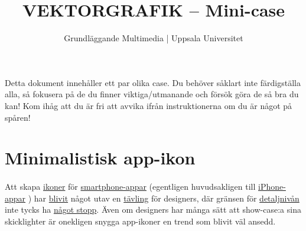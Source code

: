 \documentclass{article}
\begin{document}
  \title{ VEKTORGRAFIK -- Mini-case }
  \author{ Grundläggande Multimedia | Uppsala Universitet }
  \date{}
  \maketitle

  \paragraph{}
  Detta dokument innehåller ett par olika case. Du behöver såklart inte färdigställa alla, så fokusera på de du finner viktiga/utmanande och försök göra de så bra du kan! Kom ihåg att du är fri att avvika ifrån instruktionerna om du är något på spåren!


  \newpage
  \section{ Minimalistisk app-ikon }
    \paragraph{}
    Att skapa
    \href{http://dribbble.com/shots/561492-Checklist?list=searches&tag=app_icon}{ikoner}
    för
    \href{http://dribbble.com/shots/1000228-Payment-System-App-Icon/attachments/117809}{smartphone-appar}
    (egentligen huvudsakligen till
    \href{http://dribbble.com/shots/1040904--Go-Piano-App-Icon-Design}{iPhone-appar}
    ) har
    \href{http://dribbble.com/shots/1001782-New-Fork-App-Icon-Design/attachments/118149}{blivit}
    något utav en
    \href{http://dribbble.com/shots/114537-Wunderlist-Icon?list=searches&tag=app_icon}{tävling}
    för designers, där gränsen för
    \href{http://dribbble.com/shots/200993-Boxing-Glove-App-icon?list=searches&tag=app_icon}{detaljnivån}
    inte tycks ha
    \href{http://dribbble.com/shots/824210-waffle-iphone-icon?list=searches&tag=app_icon}{något stopp}.
    Även om designers har många sätt att show-case:a sina skicklighter är onekligen snygga app-ikoner en trend som blivit väl ansedd.
\end{document}
